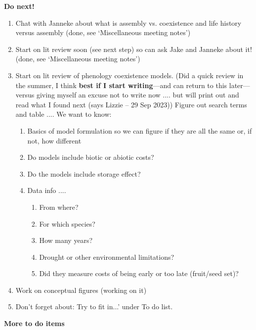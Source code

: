 \documentclass[11pt]{article}
\begin{document}
{\bf \large Do next!} 

\begin{enumerate}
\item Chat with Janneke about what is assembly vs. coexistence and life history versus assembly (done, see `Miscellaneous meeting notes') 
\item Start on lit review soon (see next step) so can ask Jake and Janneke about it! (done, see `Miscellaneous meeting notes') 
\item Start on lit review of phenology coexistence models. (Did a quick review in the summer, I think {\bf best if I start writing}---and can return to this later---versus giving myself an excuse not to write now .... but will print out and read what I found next (says Lizzie -- 29 Sep 2023)) Figure out search terms  and table .... We want to know: 
\begin{enumerate}
\item Basics of model formulation so we can figure if they are all the same or, if not, how different
\item Do models include biotic or abiotic costs?
\item Do the models include storage effect?
\item Data info ....
\begin{enumerate}
\item From where?
\item For which species?
\item How many years?
\item Drought or other environmental limitations?
\item Did they measure costs of being early or too late (fruit/seed set)?
\end{enumerate}
\end{enumerate}
\item Work on conceptual figures (working on it)
\item Don't forget about: Try to fit in...' under To do list. 
\end{enumerate}

\vspace{2ex}
{\bf \large More to do items} 
\end{document}
